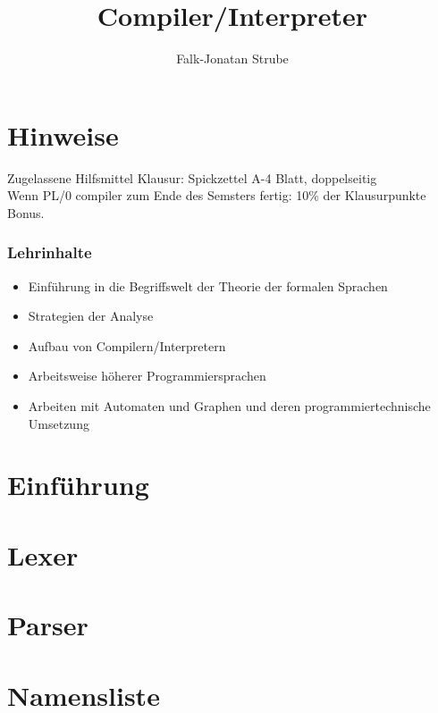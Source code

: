 \documentclass{scrreprt}
\title{Compiler/Interpreter}
\author{Falk-Jonatan Strube}
\begin{document}
\maketitle
\tableofcontents

\chapter*{Hinweise}

Zugelassene Hilfsmittel Klausur: Spickzettel A-4 Blatt, doppelseitig\\
Wenn PL/0 compiler zum Ende des Semsters fertig: 10\% der Klausurpunkte Bonus.

\subsection*{Lehrinhalte}
\begin{itemize}
\item Einführung in die Begriffswelt der Theorie der formalen Sprachen
\item Strategien der Analyse
\item Aufbau von Compilern/Interpretern
\item Arbeitsweise höherer Programmiersprachen
\item Arbeiten mit Automaten und Graphen und deren programmiertechnische Umsetzung
\end{itemize}

\chapter{Einführung}


%

\chapter{Lexer}


\chapter{Parser}



\chapter{Namensliste}

\end{document}
